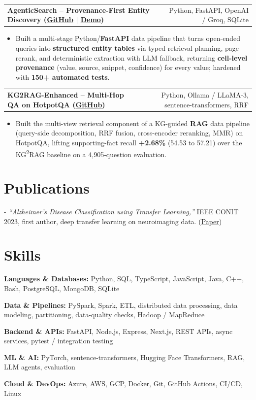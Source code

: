 \documentclass[letterpaper,11pt]{article}
\makeatletter
\newcommand{\projItem}[2]{%
  \vspace{2pt}
  \begin{tabular*}{\textwidth}{@{}l@{\extracolsep{\fill}}r@{}}
    \textbf{#1} & #2 \\
  \end{tabular*}\par\vspace{-3pt}
}
\newcommand{\skillLine}[2]{\textbf{#1:} #2\par\vspace{1.5pt}}
\newcommand{\inlineBlock}[1]{{\setlength{\leftskip}{0.18in}\small #1\par}}
\makeatother
\begin{document}
\projItem{AgenticSearch -- Provenance-First Entity Discovery {\normalfont\small(\href{https://github.com/Deva-1903/ciir_agentic_search}{GitHub} $\vert$ \href{https://agentic-search-negglszkwa-uc.a.run.app}{Demo})}}{Python, FastAPI, OpenAI / Groq, SQLite}
\begin{itemize}
  \item Built a multi-stage Python/\textbf{FastAPI} data pipeline that turns open-ended queries into \textbf{structured entity tables} via typed retrieval planning, page rerank, and deterministic extraction with LLM fallback, returning \textbf{cell-level provenance} (value, source, snippet, confidence) for every value; hardened with \textbf{150+ automated tests}.
\end{itemize}

\projItem{KG2RAG-Enhanced -- Multi-Hop QA on HotpotQA {\normalfont\small(\href{https://github.com/Deva-1903/KG2RAG-685-NLP}{GitHub})}}{Python, Ollama / LLaMA-3, sentence-transformers, RRF}
\begin{itemize}
  \item Built the multi-view retrieval component of a KG-guided \textbf{RAG} data pipeline (query-side decomposition, RRF fusion, cross-encoder reranking, MMR) on HotpotQA, lifting supporting-fact recall \textbf{+2.68\%} (54.53 to 57.21) over the KG\textsuperscript{2}RAG baseline on a 4{,}905-question evaluation.
\end{itemize}

\section{Publications}
\vspace{2pt}
\inlineBlock{- \textit{``Alzheimer's Disease Classification using Transfer Learning,''} IEEE CONIT 2023, first author, deep transfer learning on neuroimaging data. {\normalfont\small(\href{https://ieeexplore.ieee.org/document/10205760}{Paper})}}

\section{Skills}
\skillLine{Languages \& Databases}{Python, SQL, TypeScript, JavaScript, Java, C++, Bash, PostgreSQL, MongoDB, SQLite}
\skillLine{Data \& Pipelines}{PySpark, Spark, ETL, distributed data processing, data modeling, partitioning, data-quality checks, Hadoop / MapReduce}
\skillLine{Backend \& APIs}{FastAPI, Node.js, Express, Next.js, REST APIs, async services, pytest / integration testing}
\skillLine{ML \& AI}{PyTorch, sentence-transformers, Hugging Face Transformers, RAG, LLM agents, evaluation}
\skillLine{Cloud \& DevOps}{Azure, AWS, GCP, Docker, Git, GitHub Actions, CI/CD, Linux}
\end{document}
